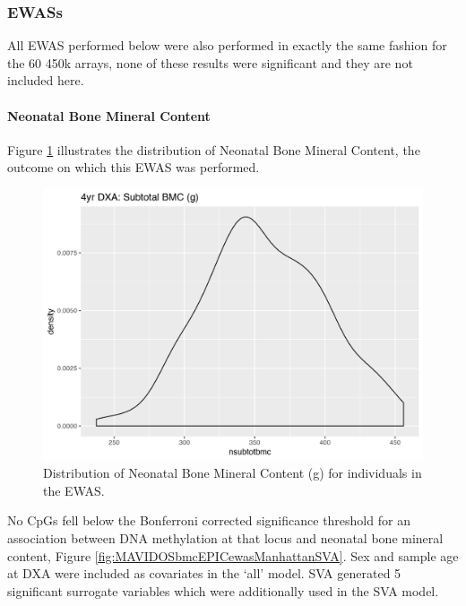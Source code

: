 \documentclass[
]{book}
\begin{document}
\hypertarget{ewass}{%
\subsubsection{EWASs}\label{ewass}}

All EWAS performed below were also performed in exactly the same fashion for the 60 450k arrays, none of these results were significant and they are not included here.

\hypertarget{neonatal-bone-mineral-content}{%
\paragraph{Neonatal Bone Mineral Content}\label{neonatal-bone-mineral-content}}

Figure \ref{fig:MAVIDOSbmc} illustrates the distribution of Neonatal Bone Mineral Content, the outcome on which this EWAS was performed.

\begin{figure}

{\centering \includegraphics[width=0.8\linewidth]{figs/MAVIDOSbmc} 

}

\caption{Distribution of Neonatal Bone Mineral Content (g) for individuals in the EWAS.}\label{fig:MAVIDOSbmc}
\end{figure}



No CpGs fell below the Bonferroni corrected significance threshold for an association between DNA methylation at that locus and neonatal bone mineral content, Figure \ref{fig:MAVIDOSbmcEPICewasManhattanSVA}.
Sex and sample age at DXA were included as covariates in the `all' model.
SVA generated 5 significant surrogate variables which were additionally used in the SVA model.
\end{document}
